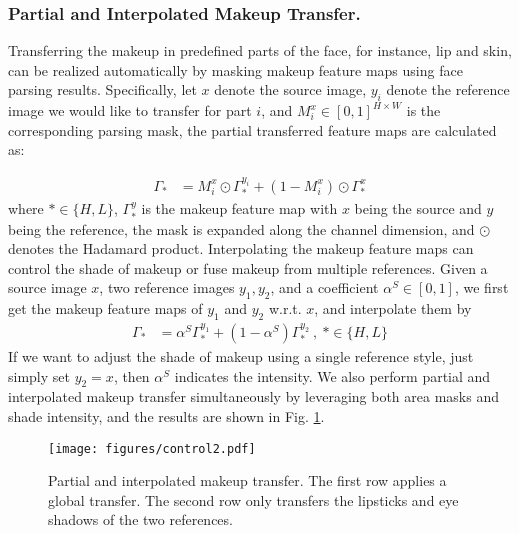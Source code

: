 \subsubsection{Partial and Interpolated Makeup Transfer.}
 Transferring the makeup in predefined parts of the face, for instance, lip and skin, can be realized automatically by masking makeup feature maps using face parsing results. Specifically, let $x$ denote the source image, $y_i$ denote the reference image we would like to transfer for part $i$, and $M_i^x\in [0,1]^{H\times W}$ is the corresponding parsing mask, the partial transferred feature maps are calculated as: 

\begin{equation}
\begin{aligned}
\Gamma_* &= M_i^x\odot \Gamma_*^{y_i} + (1- M_i^x) \odot \Gamma_*^x
\end{aligned}
\end{equation}
where $*\in \{H,L\}$, $\Gamma_*^y$ is the makeup feature map with $x$ being the source and $y$ being the reference, the mask is expanded along the channel dimension, and $\odot$ denotes the Hadamard product. Interpolating the makeup feature maps can control the shade of makeup or fuse makeup from multiple references. Given a source image $x$, two reference images $y_1,y_2$, and a coefficient $\alpha^S\in[0,1]$, we first get the makeup feature maps of $y_1$ and $y_2$ w.r.t. $x$, and interpolate them by 
\begin{equation}
\begin{aligned}
\Gamma_*&= \alpha^S \Gamma_*^{y_1} + (1-\alpha^S) \Gamma_*^{y_2}\ ,\ *\in\{H,L\}
\end{aligned}
\end{equation}
 If we want to adjust the shade of makeup using a single reference style, just simply set $y_2=x$, then $\alpha^S$ indicates the intensity. We also perform partial and interpolated makeup transfer simultaneously by leveraging both area masks and shade intensity, and the results are shown in Fig. \ref{fig:control}. 
 \begin{figure}[t]
    \setlength{\abovecaptionskip}{-0.1cm}
    \setlength{\belowcaptionskip}{0cm}
    \centering
    \texttt{[image: figures/control2.pdf]}
    \caption{Partial and interpolated makeup transfer. The first row applies a global transfer. The second row only transfers the lipsticks and eye shadows of the two references. }
    \label{fig:control}
\end{figure}

